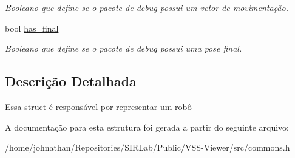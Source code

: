 \begin{DoxyCompactItemize}
\begin{DoxyCompactList}\small\item\em Booleano que define se o pacote de debug possui um vetor de movimentação. \end{DoxyCompactList}\item 
bool \hyperlink{structcommon_1_1Robot_a53ef950d28fe6fb46c21af2c0bf5eba0}{has\+\_\+final}\hypertarget{structcommon_1_1Robot_a53ef950d28fe6fb46c21af2c0bf5eba0}{}\label{structcommon_1_1Robot_a53ef950d28fe6fb46c21af2c0bf5eba0}

\begin{DoxyCompactList}\small\item\em Booleano que define se o pacote de debug possui uma pose final. \end{DoxyCompactList}\end{DoxyCompactItemize}


\subsection{Descrição Detalhada}
Essa struct é responsável por representar um robô 

A documentação para esta estrutura foi gerada a partir do seguinte arquivo\+:\begin{DoxyCompactItemize}
\item 
/home/johnathan/\+Repositories/\+S\+I\+R\+Lab/\+Public/\+V\+S\+S-\/\+Viewer/src/commons.\+h\end{DoxyCompactItemize}
